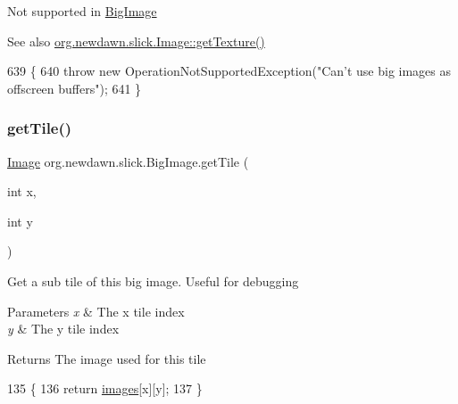 Not supported in \mbox{\hyperlink{classorg_1_1newdawn_1_1slick_1_1_big_image}{Big\+Image}}

\begin{DoxySeeAlso}{See also}
\mbox{\hyperlink{classorg_1_1newdawn_1_1slick_1_1_image_a9c033386a3dcbb5e2f2ae2354e06d5bd}{org.\+newdawn.\+slick.\+Image\+::get\+Texture()}} 
\end{DoxySeeAlso}

\begin{DoxyCode}
639                                 \{
640         \textcolor{keywordflow}{throw} \textcolor{keyword}{new} OperationNotSupportedException(\textcolor{stringliteral}{"Can't use big images as offscreen buffers"});
641     \}
\end{DoxyCode}
\mbox{\label{classorg_1_1newdawn_1_1slick_1_1_big_image_aacc0ddbbffa51082dd07962fb143495a}} 
\subsubsection{\texorpdfstring{get\+Tile()}{getTile()}}
{\footnotesize\ttfamily \mbox{\hyperlink{classorg_1_1newdawn_1_1slick_1_1_image}{Image}} org.\+newdawn.\+slick.\+Big\+Image.\+get\+Tile (\begin{DoxyParamCaption}\item[{int}]{x,  }\item[{int}]{y }\end{DoxyParamCaption})\hspace{0.3cm}{\ttfamily [inline]}}

Get a sub tile of this big image. Useful for debugging


\begin{DoxyParams}{Parameters}
{\em x} & The x tile index \\
\hline
{\em y} & The y tile index \\
\hline
\end{DoxyParams}
\begin{DoxyReturn}{Returns}
The image used for this tile 
\end{DoxyReturn}

\begin{DoxyCode}
135                                        \{
136         \textcolor{keywordflow}{return} \mbox{\hyperlink{classorg_1_1newdawn_1_1slick_1_1_big_image_a297fc524b2aef82e75e23a59c6f4102f}{images}}[x][y];
137     \}
\end{DoxyCode}
\mbox{\label{classorg_1_1newdawn_1_1slick_1_1_big_image_ae0d7fee438d9892085336ea29342580d}} 
